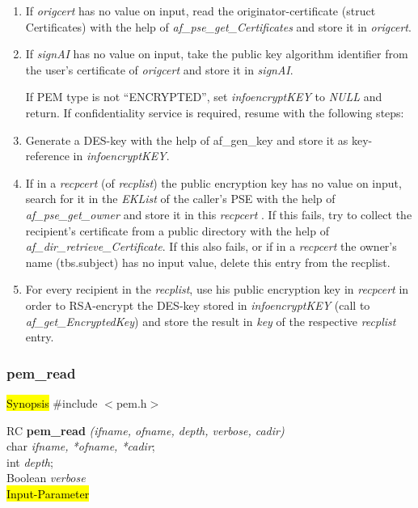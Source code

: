 \begin{enumerate}
\item
If {\em origcert} has no value on input,
read the originator-certificate (struct Certificates)
with the help of {\em af\_pse\_get\_Certificates}
and store it in {\em origcert}.
\item
If {\em signAI} has no value on input,
take the public key algorithm identifier
from the user's certificate of {\em origcert}
and store it in {\em signAI}.


If PEM type is not ``ENCRYPTED'',
set {\em info\pf encryptKEY} to {\em NULL} and return.
If confidentiality service is required, resume with the following steps:
\item
Generate a DES-key with the help of
af\_gen\_key and store it as key-reference in
{\em info\pf encryptKEY}.
\item
If in a {\em recpcert} (of {\em recplist})
the public encryption key has no value on input,
search for it in the {\em EKList} of the caller's PSE
with the help of {\em af\_pse\_get\_owner}
and store it in this {\em recpcert} .
If this fails, try to collect the recipient's certificate
from a public directory with the help of {\em af\_dir\_retrieve\_Certificate}.
If this also fails, or if
in a {\em recpcert}
the owner's name (tbs.subject) has no input value,
delete this entry from the recplist.
\item
For every recipient in the {\em recplist},
use his public encryption key in {\em recpcert}
in order to RSA-encrypt the DES-key stored in
{\em info\pf encryptKEY}
(call to {\em af\_get\_EncryptedKey}) and store
the result in {\em key} of the respective {\em recplist} entry.
\end{enumerate}

\subsubsection{pem\_read}
\label{pem_read}
\hl{Synopsis}
\#include $<$pem.h$>$ 

RC {\bf pem\_read} {\em (ifname, ofname, depth, verbose, cadir)} \\
char {\em *ifname, *ofname, *cadir}; \\
int {\em depth}; \\
Boolean {\em verbose} \\
\hl{Input-Parameter}

